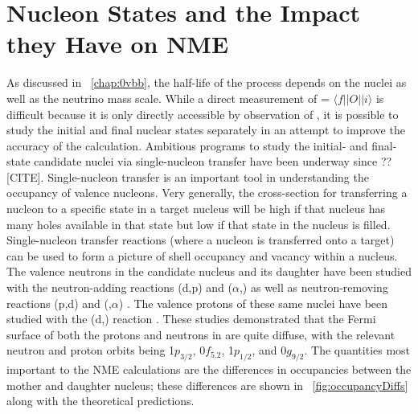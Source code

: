 \section{Nucleon States and the Impact they Have on NME}

As discussed in {\chap}~\ref{chap:0vbb}, the half-life of the \zvbb process depends on the nuclei as well as the neutrino mass scale.  While a direct measurement of \NME = $\langle f||O||i \rangle$ is difficult because it is only directly accessible by observation of \zvbb, it is possible to study the initial and final nuclear states separately in an attempt to improve the accuracy of the calculation.  Ambitious programs to study the initial- and final-state candidate nuclei via single-nucleon transfer have been underway since ?? [CITE].  Single-nucleon transfer is an important tool in understanding the occupancy of valence nucleons.  Very generally, the cross-section for transferring a nucleon to a specific state in a target nucleus will be high if that nucleus has many holes available in that state but low if that state in the nucleus is filled.  Single-nucleon transfer reactions (where a nucleon is transferred onto a target) can be used to form a picture of shell occupancy and vacancy within a nucleus.  The valence neutrons in the candidate nucleus \GeTargets and its daughter \SeProducts have been studied with the neutron-adding reactions (d,p) and ($\alpha$,) as well as neutron-removing reactions (p,d) and (,$\alpha$) \cite{valenceNeutrons}.  The valence protons of these same nuclei have been studied with the (d,) reaction \cite{valenceProtons}.  These studies demonstrated that the Fermi surface of both the protons and neutrons in \GeTargets are quite diffuse, with the relevant neutron and proton orbits being 1$p_{3/2}$, 0$f_{5.2}$, 1$p_{1/2}$, and 0$g_{9/2}$.  The quantities most important to the NME calculations are the differences in occupancies between the mother and daughter nucleus; these differences are shown in {\fig}~\ref{fig:occupancyDiffs} along with the theoretical predictions.

